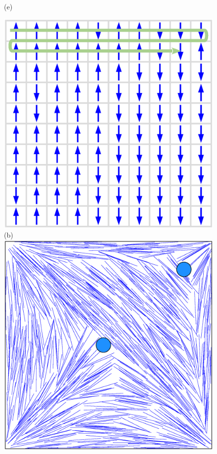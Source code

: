 \begin{figure}[!t]
\begin{minipage}[t]{0.25\textwidth}
		(e)
	\end{minipage}%
	\begin{minipage}[t]{0.25\textwidth}
		\centering
		\includegraphics[width=0.9\columnwidth]{./figs/FIG1B.eps}\\
		(b)\\ \vspace{0.5cm}
		\includegraphics[width=0.9\columnwidth]{./figs/FIG1F.eps}\\

\end{minipage}
\end{figure}
